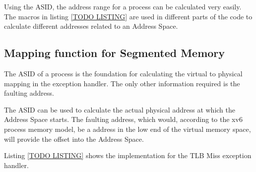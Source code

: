 Using the ASID, the address range for a process can be calculated very easily. The macros in listing \ref{TODO LISTING}
are used in different parts of the code to calculate different addresses related to an Address Space.


\subsection{Mapping function for Segmented Memory}
The ASID of a process is the foundation for calculating the virtual to physical mapping in the exception handler.
The only other information required is the faulting address.

The ASID can be used to calculate the actual physical address at which the Address Space starts.
The faulting address, which would, according to the xv6 process memory model, be a address in the low
end of the virtual memory space, will provide the offset into the Address Space.

Listing \ref{TODO LISTING} shows the implementation for the TLB Miss exception handler.





